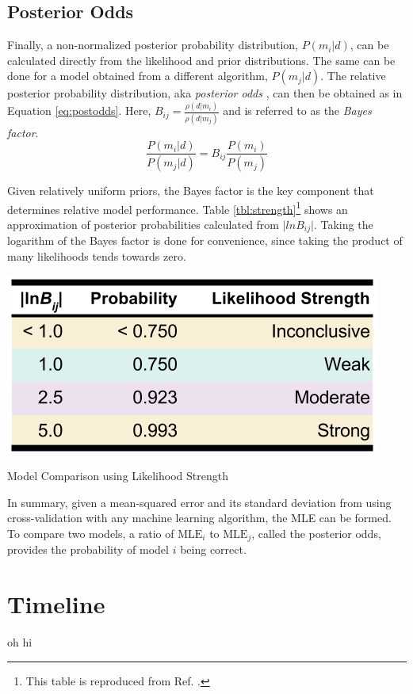\subsection{Posterior Odds}

Finally, a non-normalized posterior probability distribution, $P(m_i|d)$, can
be calculated directly from the likelihood and prior distributions. The same
can be done for a model obtained from a different algorithm, $P(m_j|d)$. The
relative posterior probability distribution, aka \textit{posterior odds}
\cite{bayes_compare}, can then be obtained as in Equation \ref{eq:postodds}.
Here, $B_{ij} = \frac{\rho(d|m_i)}{\rho(d|m_j)}$ and is referred to as the
\textit{Bayes factor}.
\begin{equation}
\label{eq:postodds}
  \frac{P(m_i|d)}{P(m_j|d)} = B_{ij} \frac{P(m_i)}{P(m_j)}
\end{equation}

Given relatively uniform priors, the Bayes factor is the key component that
determines relative model performance. Table \ref{tbl:strength}\footnote{This
table is reproduced from Ref. \cite{bayes_compare}.} shows an approximation of
posterior probabilities calculated from $\lvert lnB_{ij} \rvert$. Taking the
logarithm of the Bayes factor is done for convenience, since taking the product
of many likelihoods tends towards zero.

\begin{table}[!hbt]
  \centering
  \includegraphics[width=0.8\linewidth]{./chapters/proposal/evidence-strength.png}
  \caption{Model Comparison using Likelihood Strength}
  \label{tbl:strength}
\end{table}

In summary, given a mean-squared error and its standard deviation from using cross-validation 
with any machine learning algorithm, the \gls{MLE} can be formed. To compare two models, a ratio of $\text{MLE}_i$ to $\text{MLE}_j$,
called the posterior odds, provides the probability of model $i$ being correct.


\section{Timeline}
\label{sec:timeline}

oh hi
